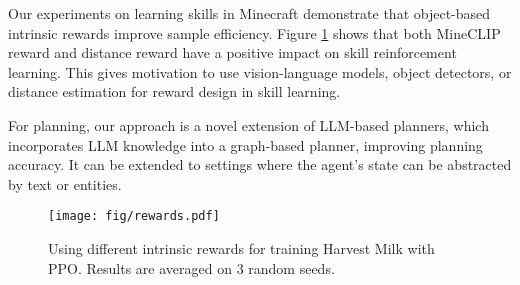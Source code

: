 \documentclass{article}
\begin{document}
Our experiments on learning skills in Minecraft demonstrate that object-based intrinsic rewards improve sample efficiency. Figure \ref{fig:intrinsic-rewards} shows that both MineCLIP reward and distance reward have a positive impact on skill reinforcement learning. This gives motivation to use vision-language models, object detectors, or distance estimation for reward design in skill learning.

For planning, our approach is a novel extension of LLM-based planners, which incorporates LLM knowledge into a graph-based planner, improving planning accuracy. It can be extended to settings where the agent's state can be abstracted by text or entities.

\begin{figure}[htbp]
  \centering
  \texttt{[image: fig/rewards.pdf]}
  \vspace{-2mm}
  \caption{Using different intrinsic rewards for training Harvest Milk with PPO. Results are averaged on 3 random seeds.}
  \label{fig:intrinsic-rewards}
\end{figure}
\end{document}
